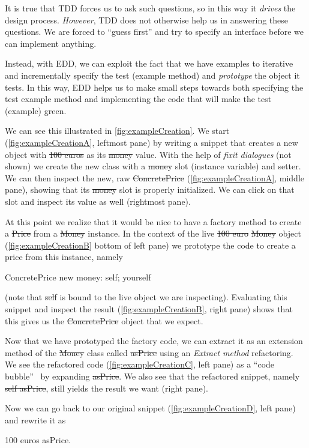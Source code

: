 \documentclass[sigplan,anonymous,review,10pt]{acmart}
\begin{document}
It is true that TDD forces us to ask such questions, so in this way it \emph{drives} the design process.
\emph{However}, TDD does not otherwise help us in answering these questions.
We are forced to ``guess first'' and try to specify an interface before we can implement anything.

Instead, with EDD, we can exploit the fact that we have examples to iterative and incrementally specify the test (example method) and \emph{prototype} the object it tests.
In this way, EDD helps us to make small steps towards both specifying the test example method and implementing the code that will make the test (example) green.

We can see this illustrated in \autoref{fig:exampleCreation}.
We start (\autoref{fig:exampleCreationA}, leftmost pane) by writing a snippet that creates a new  object with \st{100 euros} as its \st{money} value.
With the help of \emph{fixit dialogues} (not shown) we create the new class with a \st{money} slot (instance variable) and setter.
We can then inspect the new, raw \st{ConcretePrice} (\autoref{fig:exampleCreationA}, middle pane), showing that its \st{money} slot is properly initialized.
We can click on that slot and inspect its value as well (rightmost pane).

At this point we realize that it would be nice to have a factory method to create a \st{Price} from a \st{Money} instance.
In the context of the live \st{100 euro} \st{Money} object (\autoref{fig:exampleCreationB} bottom of left pane) we prototype the code to create a price from this instance, namely
\begin{code}
ConcretePrice new money: self; yourself
\end{code}
(note that \st{self} is bound to the live object we are inspecting).
Evaluating this snippet and inspect the result (\autoref{fig:exampleCreationB}, right pane) shows that this gives us the \st{ConcretePrice} object that we expect.

Now that we have prototyped the factory code, we can extract it as an extension method of the \st{Money} class called \st{asPrice} using an \emph{Extract method} refactoring.
We see the refactored code (\autoref{fig:exampleCreationC}, left pane) as a ``code bubble''~\cite{Brag10a} by expanding \st{asPrice}.
We also see that the refactored snippet, namely \st{self asPrice}, still yields the result  we want (right pane).

Now we can go back to our original snippet (\autoref{fig:exampleCreationD}, left pane) and rewrite it as
\begin{code}
100 euros asPrice.
\end{code}
\end{document}
